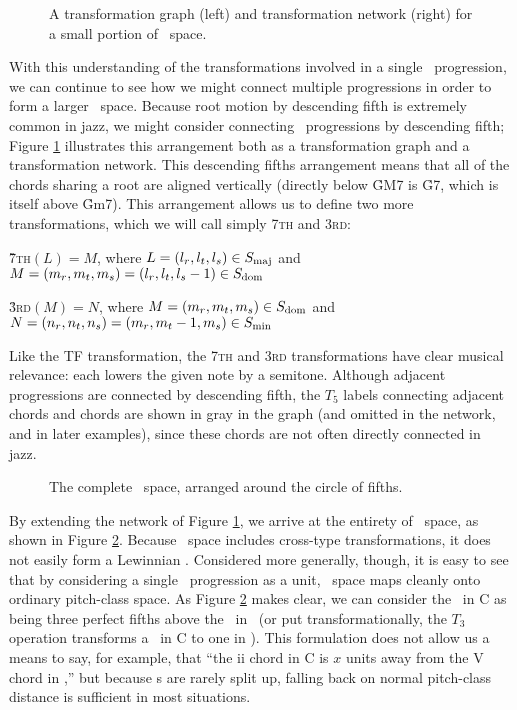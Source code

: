\begin{figure}[tbp]
  \caption[A transformation graph and network for a small portion of \tf\
    space]{A transformation graph (left) and transformation network (right)
    for a small portion of \tf\ space.}
  \label{tf:trans-graph-large}
\end{figure}

With this understanding of the transformations involved in a single \tfo\
progression, we can continue to see how we might connect multiple progressions
in order to form a larger \tf\ space. Because root motion by descending
fifth is extremely common in jazz, we might consider connecting \tfo\
progressions by descending fifth; Figure \ref{tf:trans-graph-large}
illustrates this arrangement both as a transformation graph and a
transformation network.  This descending fifths arrangement means that all of
the chords sharing a root are aligned vertically (directly below \h{GM7} is
\h{G7}, which is itself above \h{Gm7}). This arrangement allows us to define
two more transformations, which we will call simply \textsc{7th} and
\textsc{3rd}:

\vspace{0.5\baselineskip}
\h{7}\textsc{th}$(L) = M$, where $L = (l_r, l_t, l_s) \in S_{\mathrm{maj}}$ and $M=(m_r, m_t,
m_s)=(l_r, l_t, l_s-1) \in S_{\mathrm{dom}}$

\h{3}\textsc{rd}$(M) = N$, where $M = (m_r, m_t, m_s) \in S_{\mathrm{dom}}$ and $N=(n_r, n_t,
n_s)=(m_r, m_t-1, m_s) \in S_{\mathrm{min}}$
\vspace{0.5\baselineskip}

\noindent Like the TF transformation, the \textsc{7th} and \textsc{3rd}
transformations have clear musical relevance: each lowers the given note by a
semitone. Although adjacent progressions are connected by descending fifth,
the $T_5$ labels connecting adjacent \ii chords and \I chords
are shown in gray in the graph (and omitted in the network, and in later
examples), since these chords are not often directly connected in jazz.

\begin{figure}[thb]
  \centerGraphic{eps/ch2/tf-circle-fifths.pdf}
  \caption{The complete \tf\ space, arranged around the circle of fifths.}
  \label{tf:tf-circle-fifths}
\end{figure}

By extending the network of Figure \ref{tf:trans-graph-large}, we arrive at
the entirety of \tf\ space, as shown in Figure \ref{tf:tf-circle-fifths}.
Because \tf\ space includes cross-type transformations, it does not easily
form a Lewinnian \gis.\fn{tf-8} Considered more generally, though, it is easy
to see that by considering a single \tfo\ progression as a unit, \tf\ space
maps cleanly onto ordinary pitch-class space. As Figure
\ref{tf:tf-circle-fifths} makes clear, we can consider the \tfo\ in C as
being three perfect fifths above the \tfo\ in \Eflat\ (or put
transformationally, the $T_3$ operation transforms a \tfo\ in C to one in
\Eflat). This formulation does not allow us a means to say, for example, that
“the ii chord in C is $x$ units away from the V chord in \Eflat,” but because
\tfo{}s are rarely split up, falling back on normal pitch-class distance is
sufficient in most situations.\fn{tf-9}

